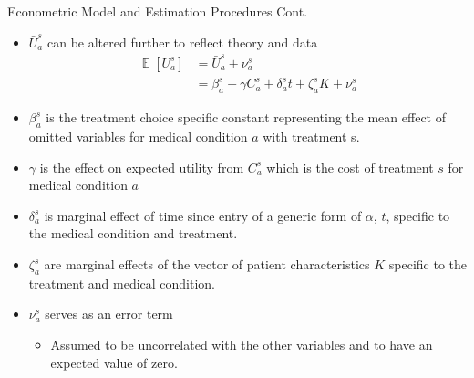 \documentclass{beamer}
\DeclareMathOperator{\EX}{\mathbb{E}}
\begin{document}
\begin{frame}{Econometric Model and Estimation Procedures Cont.}
\begin{itemize}
\item $\bar{U}_a^s$ can be altered further to reflect theory and data
\begin{equation}
\begin{split}  \EX[U_a^s] & =\bar{U}_a^s + \nu_a^s\\
& = \beta_a^s + \gamma C_a^s + \delta_a^st + \zeta_a^sK + \nu_a^s
\end{split}
\end{equation}
\item $\beta_a^s$ is the treatment choice specific constant representing the mean effect of omitted variables for medical condition $a$ with treatment s.
\item $\gamma$ is the effect on expected utility from $C_a^s$ which is the cost of treatment $s$ for medical condition $a$
\item $\delta_a^s$ is marginal effect of time since entry of a generic form of $\alpha$, $t$, specific to the medical condition and treatment.
\item $\zeta_a^s$ are marginal effects of the vector of patient characteristics $K$ specific to the treatment and medical condition.
\item $\nu_a^s$ serves as an error term
\begin{itemize}
  \item Assumed to be uncorrelated with the other variables and to have an expected value of zero.
\end{itemize}
\end{itemize}
\end{frame}
\end{document}
